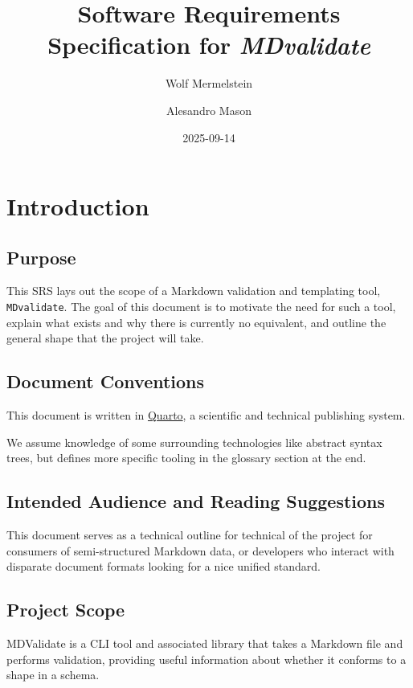 \documentclass[
]{article}
\title{Software Requirements Specification for \emph{MDvalidate}}
\author{Wolf Mermelstein \and Alesandro Mason}
\date{2025-09-14}
\renewcommand*\contentsname{Table of contents}
\newcommand\contentsname{Table of contents}
\begin{document}
\maketitle

\renewcommand*\contentsname{Table of contents}
{
\hypersetup{linkcolor=}
\setcounter{tocdepth}{3}
\tableofcontents
}

\section{Introduction}\label{introduction}

\subsection{Purpose}\label{purpose}

This SRS lays out the scope of a Markdown validation and templating
tool, \texttt{MDvalidate}. The goal of this document is to motivate the
need for such a tool, explain what exists and why there is currently no
equivalent, and outline the general shape that the project will take.

\subsection{Document Conventions}\label{document-conventions}

This document is written in \href{https://quarto.org/}{Quarto}, a
scientific and technical publishing system.

We assume knowledge of some surrounding technologies like abstract
syntax trees, but defines more specific tooling in the glossary section
at the end.

\subsection{Intended Audience and Reading
Suggestions}\label{intended-audience}

This document serves as a technical outline for technical of the project
for consumers of semi-structured Markdown data, or developers who
interact with disparate document formats looking for a nice unified
standard.

\subsection{Project Scope}\label{project-scope}

MDValidate is a CLI tool and associated library that takes a Markdown
file and performs validation, providing useful information about whether
it conforms to a shape in a schema.
\end{document}

